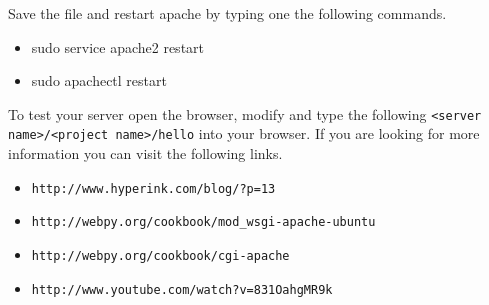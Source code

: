 \documentclass[a4paper]{article}
\begin{document}
Save the file and restart apache by typing one the following commands.
\begin{itemize}
\item sudo service apache2 restart
\item sudo apachectl restart
\end{itemize}
To test your server open the browser, modify and type the following \verb#<server name>/<project name>/hello# into your browser.
If you are looking for more information you can visit the following links.
\begin{itemize}
\item \verb#http://www.hyperink.com/blog/?p=13#
\item \verb#http://webpy.org/cookbook/mod_wsgi-apache-ubuntu#
\item \verb#http://webpy.org/cookbook/cgi-apache#
\item \verb#http://www.youtube.com/watch?v=831OahgMR9k#
\end{itemize}
\end{document}
